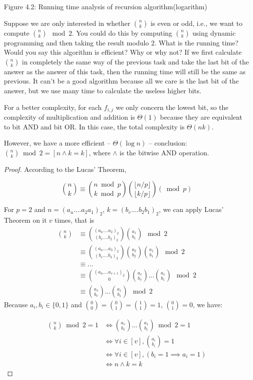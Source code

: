 \documentclass[11pt,a4paper,oneside]{article}
\begin{document}
\begin{problem}{4}
\begin{center}
	Figure 4.2: Running time analysis of recursion algorithm(logarithm)
	\end{center}
\end{problem}

\begin{problem}{5}
    \statement
    Suppose we are only interested in whether ${n \choose k}$ is even or odd,
  i.e., we want to compute ${n \choose k}  \mod 2$. You could do this by computing 
  ${n \choose k}$ using dynamic programming and then taking
  the result modulo $2$. What is the running time? Would you say this algorithm
  is efficient? Why or why not?
  \solution
If we first calculate ${n \choose k}$ in completely the same way of the previous task and take the last bit of the answer as the answer of this task, then the running time will still be the same as previous. It can't be a good algorithm because all we care is the last bit of the answer, but we use many time to calculate the useless higher bits.

For a better complexity, for each $f_{i, j}$ we only concern the lowest bit, so the complexity of multiplication and addition is $\Theta(1)$ because they are equivalent to bit AND and bit OR. In this case, the total complexity is $\Theta(nk)$.

However, we have a more efficient  -- $\Theta (\log n)$ -- conclusion:  $ {n \choose k} \bmod 2 = [n \wedge k = k]$, where $\wedge$ is the bitwise AND operation.
	\begin{proof}
		According to the Lucas' Theorem, 
		
		\[
			{n \choose k}\equiv{{n \bmod p} \choose {k \bmod p}}{{ \lfloor n/p\rfloor} \choose { \lfloor k/p\rfloor}}(\bmod p)
		\]
		
		For $p=2$ and $n=(a_u....a_2a_1)_2$, $k=(b_v....b_2b_1)_2$, we can apply Lucas' Theorem on it $v$ times, that is
		\begin{align*}
			{n \choose k} &\equiv {(a_u....a_2)_2 \choose (b_v....b_2)_2}{a_1 \choose b_1}\mod 2\\
			&\equiv {(a_u....a_3)_2 \choose (b_v....b_3)_2}{a_2 \choose b_2}{a_1 \choose b_1}\mod 2 \\
			&\equiv ...\\	
			&\equiv {(a_u....a_{v+1})_2 \choose 0}{a_v \choose b_v}...{a_1 \choose b_1}\mod 2\\
			&\equiv {a_v \choose b_v}...{a_1 \choose b_1}\mod 2
		\end{align*}		
		Because $a_i,b_i\in \{0,1\}$ and ${0 \choose 0}={0 \choose 1}={1 \choose 1}=1$, ${0 \choose 1}=0$, we have:
		
		\[
			\begin{split}
			{n \choose k} \bmod 2 = 1 &\Leftrightarrow {a_v \choose b_v}...{a_1 \choose b_1}\bmod 2=1 \\
			&\Leftrightarrow \forall i \in [v], {a_i \choose b_i}=1\\
			&\Leftrightarrow \forall i \in [v], (b_i=1\implies a_i=1)\\
			&\Leftrightarrow n \wedge k = k
			\end{split}
		\]		
    \end{proof}
\end{problem}
\end{document}
